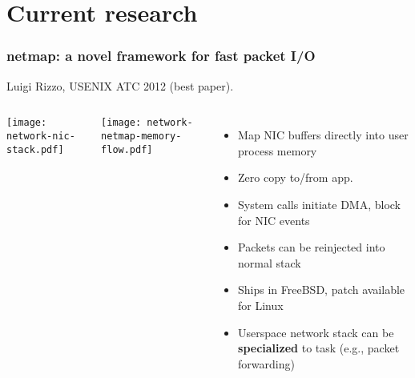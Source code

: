 


%
%
%

\section{Current research}

\begin{frame}
  \frametitle{netmap: a novel framework for fast packet I/O}

  Luigi Rizzo, USENIX ATC 2012 (best paper).

  \begin{columns}[T]

      \smallskip
      \texttt{[image: network-nic-stack.pdf]}

      \bigskip
      \texttt{[image: network-netmap-memory-flow.pdf]}


    \pause

    \begin{itemize}
      \item Map NIC buffers directly into user process memory
      \item Zero copy to/from app.

      \medskip
      \pause

      \item System calls initiate DMA, block for NIC events
      \item Packets can be reinjected into normal stack
      \item Ships in FreeBSD, patch available for Linux

      \medskip
      \pause

      \item Userspace network stack can be \textbf{specialized} to task
	(e.g., packet forwarding)
    \end{itemize}
  \end{columns}
\end{frame}

